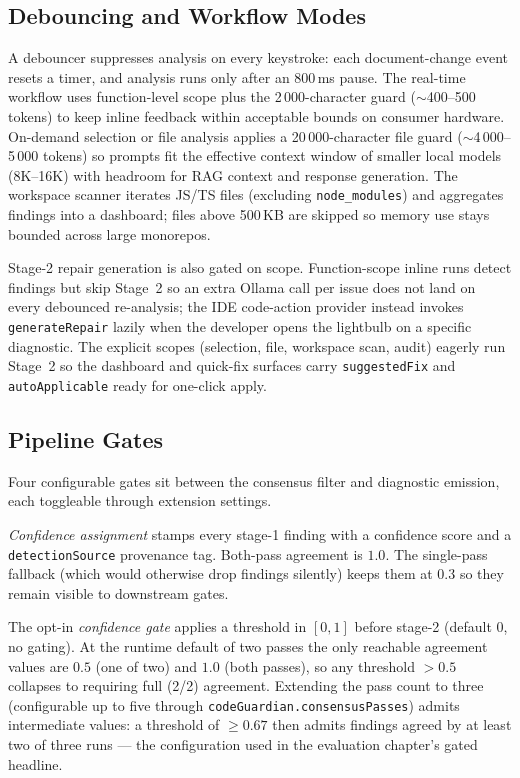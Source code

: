 \subsection{Debouncing and Workflow Modes}

A debouncer suppresses analysis on every keystroke: each document-change event resets a timer, and analysis runs only after an 800\,ms pause. The real-time workflow uses function-level scope plus the 2\,000-character guard ($\sim$400--500 tokens) to keep inline feedback within acceptable bounds on consumer hardware. On-demand selection or file analysis applies a 20\,000-character file guard ($\sim$4\,000--5\,000 tokens) so prompts fit the effective context window of smaller local models (8K--16K) with headroom for RAG context and response generation. The workspace scanner iterates JS/TS files (excluding \texttt{node\_modules}) and aggregates findings into a dashboard; files above 500\,KB are skipped so memory use stays bounded across large monorepos.

Stage-2 repair generation is also gated on scope. Function-scope inline runs detect findings but skip Stage~2 so an extra Ollama call per issue does not land on every debounced re-analysis; the IDE code-action provider instead invokes \texttt{generateRepair} lazily when the developer opens the lightbulb on a specific diagnostic. The explicit scopes (selection, file, workspace scan, audit) eagerly run Stage~2 so the dashboard and quick-fix surfaces carry \texttt{suggestedFix} and \texttt{autoApplicable} ready for one-click apply.

\subsection{Pipeline Gates}

Four configurable gates sit between the consensus filter and diagnostic emission, each toggleable through extension settings.

\emph{Confidence assignment} stamps every stage-1 finding with a confidence score and a \texttt{detectionSource} provenance tag. Both-pass agreement is $1.0$. The single-pass fallback (which would otherwise drop findings silently) keeps them at $0.3$ so they remain visible to downstream gates.

The opt-in \emph{confidence gate} applies a threshold in $[0,1]$ before stage-2 (default $0$, no gating). At the runtime default of two passes the only reachable agreement values are $0.5$ (one of two) and $1.0$ (both passes), so any threshold $> 0.5$ collapses to requiring full (2/2) agreement. Extending the pass count to three (configurable up to five through \texttt{codeGuardian.consensusPasses}) admits intermediate values: a threshold of $\geq 0.67$ then admits findings agreed by at least two of three runs --- the configuration used in the evaluation chapter's gated headline.

